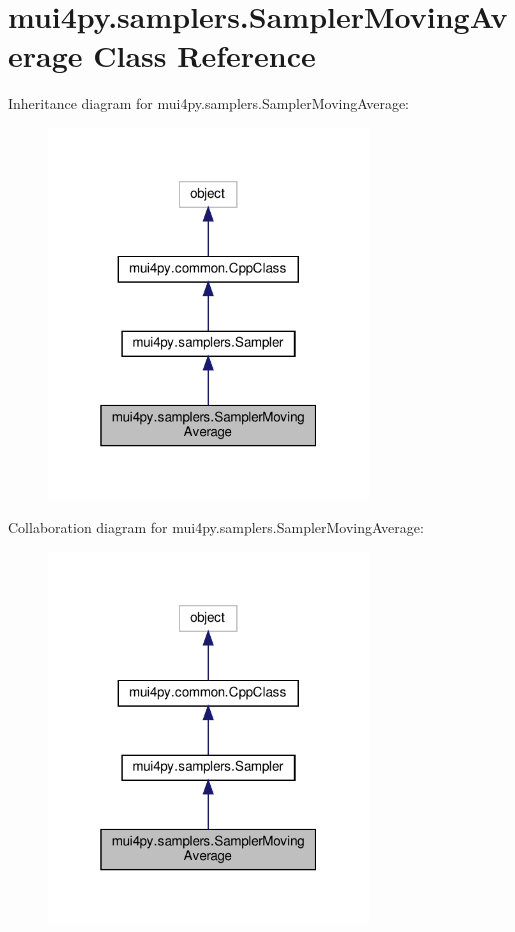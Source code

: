 \hypertarget{classmui4py_1_1samplers_1_1_sampler_moving_average}{}\section{mui4py.\+samplers.\+Sampler\+Moving\+Average Class Reference}
\label{classmui4py_1_1samplers_1_1_sampler_moving_average}


Inheritance diagram for mui4py.\+samplers.\+Sampler\+Moving\+Average\+:
\nopagebreak
\begin{figure}[H]
\begin{center}
\leavevmode
\includegraphics[width=241pt]{classmui4py_1_1samplers_1_1_sampler_moving_average__inherit__graph}
\end{center}
\end{figure}


Collaboration diagram for mui4py.\+samplers.\+Sampler\+Moving\+Average\+:
\nopagebreak
\begin{figure}[H]
\begin{center}
\leavevmode
\includegraphics[width=241pt]{classmui4py_1_1samplers_1_1_sampler_moving_average__coll__graph}
\end{center}
\end{figure}
